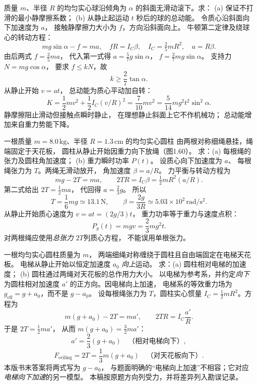 质量 $m$、半径 $R$ 的均匀实心球沿倾角为
$\alpha$ 的斜面无滑动滚下。求：
(a) 保证不打滑的最小静摩擦系数；
(b) 从静止起运动 $t$ 秒后的球的总动能。
\exsolution
令质心沿斜面向下加速度为 $a$，
接触静摩擦力大小为 $f$，方向沿斜面向上。
牛顿第二定律及绕球心的转动方程：
\[
mg\sin\alpha-f=ma,\quad
fR=I_C\beta,\quad
I_C=\tfrac25mR^2,\quad a=R\beta.
\]
由后两式 $f=\frac25ma$，
代入第一式得
$a=\frac57g\sin\alpha$，
$f=\frac27mg\sin\alpha$。
支持力 $N=mg\cos\alpha$，
要求 $f\le kN$，故
\[
\boxed{k\ge\frac27\tan\alpha}.
\]
从静止开始 $v=at$，
总动能为质心平动加自转：
\[
K=\frac12mv^2+\frac12I_C(v/R)^2
=\frac7{10}mv^2
=\boxed{\frac5{14}mg^2t^2\sin^2\alpha}.
\]
\excheck 静摩擦阻止滑动但接触点瞬时静止，
在理想静止斜面上它不作机械功；
总动能增加来自重力势能下降。

一根质量 $m=8.0\,\mathrm{kg}$、半径
$R=1.3\,\mathrm{cm}$ 的均匀实心圆柱
由两根对称细绳悬挂，绳端固定于天花板，
圆柱从静止开始因重力向下放绳（图1.60）。
求：(a) 每根绳的张力及圆柱角加速度；
(b) 重力瞬时功率 $P(t)$。
\exsolution
设质心向下加速度为 $a$、
每根绳张力为 $T$。两绳无滑动放开，
角加速度 $\beta=a/R$。
力平衡与转动方程为
\[
mg-2T=ma,\qquad
2TR=I_C\beta=\tfrac12mR^2(a/R).
\]
第二式给出 $2T=\frac12ma$，
代回得 $a=\frac23g$。
所以
\[
\boxed{T=\frac16mg\simeq13.1\,\mathrm N},
\qquad
\boxed{\beta=\frac{2g}{3R}\simeq5.03\times10^2\,
\mathrm{rad/s^2}}.
\]
从静止开始质心速度为 $v=at=(2g/3)t$，
重力功率等于重力与速度点积：
\[
\boxed{P_g(t)=mgv=\frac23mg^2t}.
\]
\excheck 对两根绳应使用\emph{总张力 $2T$}列质心方程，
不能误用单根张力。

一根均匀实心圆柱质量为 $m$，
两端细绳对称缠绕于圆柱且自由端固定在电梯天花板。
电梯从静止开始以恒定加速度 $a_0$ \emph{向上}运动。
求：(a) 圆柱相对电梯的加速度；
(b) 圆柱通过两绳对天花板的总作用力大小。
\exsolution
以电梯为参考系，并约定\emph{向下}为圆柱相对加速度
$a'$ 的正方向。因电梯向上加速，
电梯系的等效重力场为
$g_{\mathrm{eff}}=g+a_0$，而不是 $g-a_0$。
设每根绳张力为 $T$，圆柱实心惯量
$I_C=\frac12mR^2$。方程为
\[
m(g+a_0)-2T=ma',\qquad
2TR=I_C\frac{a'}R.
\]
于是 $2T=\frac12ma'$，
从而 $m(g+a_0)=\frac32ma'$：
\[
\boxed{a'=\frac23(g+a_0)\quad\text{（相对电梯向下）}},
\]
\[
\boxed{F_{\mathrm{ceiling}}=2T=\frac13m(g+a_0)
\quad\text{（对天花板向下）}}.
\]
\excheck 本版书末答案将两式写为 $g-a_0$，
与题面明确的“电梯向上加速”不相容；它对应
\emph{电梯向下加速}的另一模型。
本稿按原题方向列受力，并将差异列入勘误记录。

